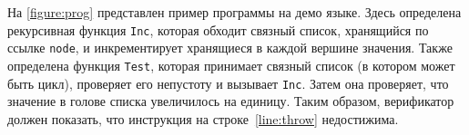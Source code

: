 \begin{exmp}\label{exmp:prog}
На \autoref{figure:prog} представлен пример программы на демо языке. Здесь определена рекурсивная функция \texttt{Inc}, которая обходит связный список, хранящийся по ссылке \texttt{node}, и инкрементирует хранящиеся в каждой вершине значения. Также определена функция \texttt{Test}, которая принимает связный список (в котором может быть цикл), проверяет его непустоту и вызывает \texttt{Inc}. Затем она проверяет, что значение в голове списка увеличилось на единицу. Таким образом, верификатор должен показать, что инструкция \kwdfail{} на строке~\ref{line:throw} недостижима.
\end{exmp}
